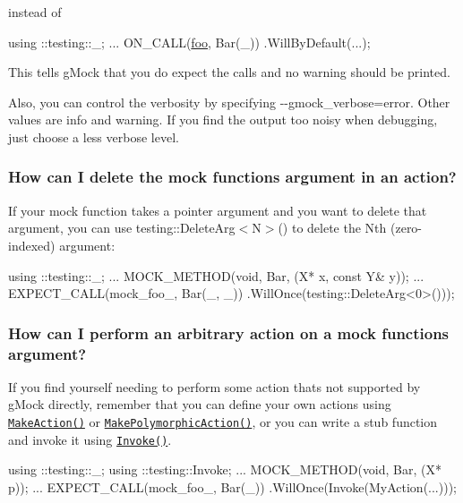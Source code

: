 instead of


\begin{DoxyCode}
using ::testing::\_;
...
  ON\_CALL(\mbox{\hyperlink{namespacefoo}{foo}}, Bar(\_))
      .WillByDefault(...);
\end{DoxyCode}


This tells g\+Mock that you do expect the calls and no warning should be printed.

Also, you can control the verbosity by specifying {\ttfamily -\/-\/gmock\+\_\+verbose=error}. Other values are {\ttfamily info} and {\ttfamily warning}. If you find the output too noisy when debugging, just choose a less verbose level.

\subsubsection*{How can I delete the mock function\textquotesingle{}s argument in an action?}

If your mock function takes a pointer argument and you want to delete that argument, you can use testing\+::\+Delete\+Arg$<$\+N$>$() to delete the N\textquotesingle{}th (zero-\/indexed) argument\+:


\begin{DoxyCode}
using ::testing::\_;
  ...
  MOCK\_METHOD(\textcolor{keywordtype}{void}, Bar, (X* x, \textcolor{keyword}{const} Y& y));
  ...
  EXPECT\_CALL(mock\_foo\_, Bar(\_, \_))
      .WillOnce(testing::DeleteArg<0>()));
\end{DoxyCode}


\subsubsection*{How can I perform an arbitrary action on a mock function\textquotesingle{}s argument?}

If you find yourself needing to perform some action that\textquotesingle{}s not supported by g\+Mock directly, remember that you can define your own actions using \href{#NewMonoActions}{\tt {\ttfamily Make\+Action()}} or \href{#NewPolyActions}{\tt {\ttfamily Make\+Polymorphic\+Action()}}, or you can write a stub function and invoke it using \href{#FunctionsAsActions}{\tt {\ttfamily Invoke()}}.


\begin{DoxyCode}
using ::testing::\_;
using ::testing::Invoke;
  ...
  MOCK\_METHOD(\textcolor{keywordtype}{void}, Bar, (X* p));
  ...
  EXPECT\_CALL(mock\_foo\_, Bar(\_))
      .WillOnce(Invoke(MyAction(...)));
\end{DoxyCode}


